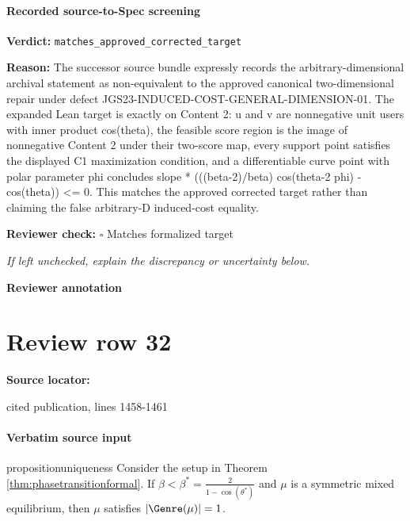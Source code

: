 \documentclass[10pt]{article}
\newcommand{\reviewerbox}{%
  \par\noindent\fbox{\parbox{0.96\linewidth}{\rule{0pt}{0.38in}}}\par
}
\newcommand{\reviewmatch}[1]{%
  \par\noindent\textbf{Reviewer check:} $\square$\; #1\par
  \noindent\emph{If left unchecked, explain the discrepancy or uncertainty below.}\par
}
\begin{document}
\paragraph{Recorded source-to-Spec screening}
\textbf{Verdict:} \texttt{matches\_approved\_corrected\_target}
\\
{\raggedright
\textbf{Reason:} The successor source bundle expressly records the arbitrary-\allowbreak{}dimensional archival statement as non-\allowbreak{}equivalent to the approved canonical two-\allowbreak{}dimensional repair under defect JGS23-\allowbreak{}INDUCED-\allowbreak{}COST-\allowbreak{}GENERAL-\allowbreak{}DIMENSION-\allowbreak{}01.\allowbreak{} The expanded Lean target is exactly on Content 2:\allowbreak{} u and v are nonnegative unit users with inner product cos(theta), the feasible score region is the image of nonnegative Content 2 under their two-\allowbreak{}score map, every support point satisfies the displayed C1 maximization condition, and a differentiable curve point with polar parameter phi concludes slope * (((beta-\allowbreak{}2)/\allowbreak{}beta) cos(theta-\allowbreak{}2 phi) -\allowbreak{} cos(theta)) <= 0.\allowbreak{} This matches the approved corrected target rather than claiming the false arbitrary-\allowbreak{}D induced-\allowbreak{}cost equality.\allowbreak{}
\par}
\reviewmatch{Matches formalized target}
\noindent\textbf{Reviewer annotation}\par
\reviewerbox
\clearpage
\hypertarget{source-claim-66a33fae08b6ea22}{}
\section*{Review row 32}
\textbf{Source locator:} {\footnotesize\raggedright cited publication, lines 1458-\allowbreak{}1461\par}
\paragraph{Verbatim source input}
\begin{ReviewVerbatim}
\begin{restatable}{proposition}{uniqueness}
\label{prop:uniqueness}
Consider the setup in Theorem \ref{thm:phasetransitionformal}. If $\beta < \beta^* = \frac{2}{1 - \cos(\theta^*)}$ and $\mu$ is a symmetric mixed equilibrium, then $\mu$ satisfies $|\Genre(\mu)| = 1$.
\end{restatable}
\end{ReviewVerbatim}
\end{document}

